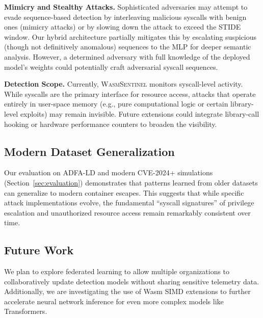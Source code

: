 \textbf{Mimicry and Stealthy Attacks.}
Sophisticated adversaries may attempt to evade sequence-based detection by interleaving malicious syscalls with benign ones (mimicry attacks) or by slowing down the attack to exceed the STIDE window.
Our hybrid architecture partially mitigates this by escalating suspicious (though not definitively anomalous) sequences to the MLP for deeper semantic analysis.
However, a determined adversary with full knowledge of the deployed model's weights could potentially craft adversarial syscall sequences.

\textbf{Detection Scope.}
Currently, \textsc{WasmSentinel} monitors syscall-level activity.
While syscalls are the primary interface for resource access, attacks that operate entirely in user-space memory (e.g., pure computational logic or certain library-level exploits) may remain invisible.
Future extensions could integrate library-call hooking or hardware performance counters to broaden the visibility.

\subsection{Modern Dataset Generalization}
Our evaluation on ADFA-LD and modern CVE-2024+ simulations (Section~\ref{sec:evaluation}) demonstrates that patterns learned from older datasets can generalize to modern container escapes.
This suggests that while specific attack implementations evolve, the fundamental ``syscall signatures'' of privilege escalation and unauthorized resource access remain remarkably consistent over time.

\subsection{Future Work}
We plan to explore federated learning to allow multiple organizations to collaboratively update detection models without sharing sensitive telemetry data.
Additionally, we are investigating the use of Wasm SIMD extensions to further accelerate neural network inference for even more complex models like Transformers.
